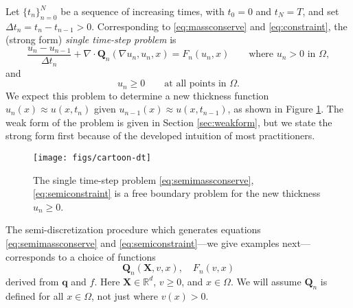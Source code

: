 \documentclass[final,onefignum]{siamart190516}
\newcommand\bq{\mathbf{q}}
\newcommand\bQ{\mathbf{Q}}
\newcommand\bX{\mathbf{X}}
\newcommand{\Div}{\nabla\cdot}
\newcommand{\grad}{\nabla}
\newcommand\RR{\mathbb{R}}
\begin{document}
Let $\{t_n\}_{n=0}^N$ be a sequence of increasing times, with $t_0=0$ and $t_N=T$, and set $\Delta t_n = t_n-t_{n-1}>0$.  Corresponding to \eqref{eq:massconserve} and \eqref{eq:constraint}, the (strong form) \emph{single time-step problem} is
\begin{equation}
\frac{u_n - u_{n-1}}{\Delta t_n} + \Div \bQ_n(\grad u_n,u_n,x) = F_n(u_n,x) \qquad \text{where $u_n > 0$ in $\Omega$}, \label{eq:semimassconserve}
\end{equation}
and
\begin{equation}
u_n \ge 0 \qquad \text{at all points in } \Omega. \label{eq:semiconstraint}
\end{equation}
We expect this problem to determine a new thickness function $u_n(x) \approx u(x,t_n)$ given $u_{n-1}(x) \approx u(x,t_{n-1})$, as shown in Figure \ref{fig:timestepcartoon}.  The weak form of the problem is given in Section \ref{sec:weakform}, but we state the strong form first because of the developed intuition of most practitioners.

\begin{figure}[ht]
\begin{center}
\texttt{[image: figs/cartoon-dt]}
\end{center}
\caption{The single time-step problem \eqref{eq:semimassconserve}, \eqref{eq:semiconstraint} is a free boundary problem for the new thickness $u_n\ge 0$.}
\label{fig:timestepcartoon}
\end{figure}

The semi-discretization procedure which generates equations \eqref{eq:semimassconserve} and \eqref{eq:semiconstraint}---we give examples next---corresponds to a choice of functions
\begin{equation}
\bQ_n(\bX,v,x), \quad F_n(v,x) \label{eq:functionalforms}
\end{equation}
derived from $\bq$ and $f$.  Here $\bX\in\RR^d$, $v\ge 0$, and $x\in \Omega$.  We will assume $\bQ_n$ is defined for all $x\in\Omega$, not just where $v(x)>0$.
\end{document}

